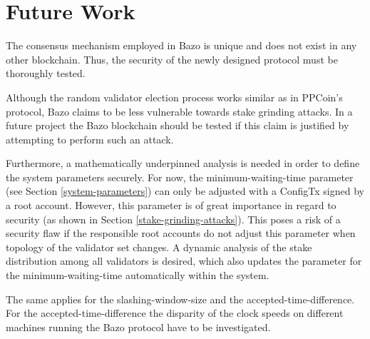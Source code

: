 \chapter{Future Work}

The consensus mechanism employed in Bazo is unique and does not exist in any other blockchain. Thus, the security of the newly designed protocol must be thoroughly tested. 

Although the random validator election process works similar as in PPCoin's protocol, Bazo claims to be less vulnerable towards stake grinding attacks. In a future project the Bazo blockchain should be tested if this claim is justified by attempting to perform such an attack. 

Furthermore, a mathematically underpinned analysis is needed in order to define the system parameters securely. For now, the minimum-waiting-time parameter (see Section \ref{system-parameters}) can only be adjusted with a ConfigTx signed by a root account. However, this parameter is of great importance in regard to security (as shown in Section \ref{stake-grinding-attacks}). This poses a risk of a security flaw if the responsible root accounts do not adjust this parameter when topology of the validator set changes. A dynamic analysis of the stake distribution among all validators is desired, which also updates the parameter for the minimum-waiting-time automatically within the system. 

The same applies for the slashing-window-size and the accepted-time-difference. For the accepted-time-difference the disparity of the clock speeds on different machines running the Bazo protocol have to be investigated.